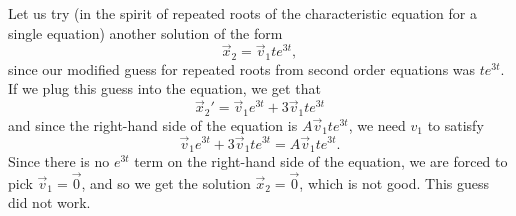 \begin{example}
Let us try (in the spirit of repeated roots of the
characteristic equation for a single equation) another solution of the form
\begin{equation*}
\vec{x}_2 = \vec{v}_1 te^{3t},
\end{equation*}
since our modified guess for repeated roots from second order equations was $te^{3t}$. If we plug this guess into the equation, we get that
\begin{equation*}
\vec{x}_2' = \vec{v}_1 e^{3t} + 3\vec{v}_1te^{3t}
\end{equation*}
and since the right-hand side of the equation is $A\vec{v}_1te^{3t}$, we need $v_1$ to satisfy
\begin{equation*}
\vec{v}_1 e^{3t} + 3\vec{v}_1te^{3t} = A\vec{v}_1te^{3t}.
\end{equation*}
Since there is no $e^{3t}$ term on the right-hand side of the equation, we are forced to pick $\vec{v}_1 = \vec{0}$, and so  we get the solution $\vec{x}_2 = \vec{0}$, which is not good. This guess did not work.


\end{example}
